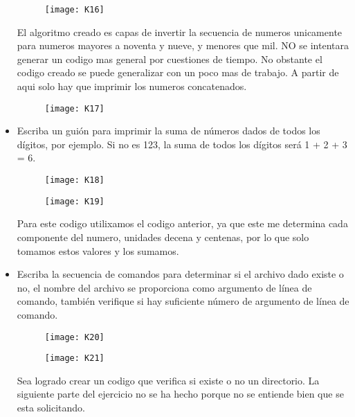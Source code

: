 \documentclass{article}
\begin{document}
\begin{itemize}
\begin{figure}[H]
\centerline{\texttt{[image: K16]}}
\caption{}
\label{fig}
\end{figure}

El algoritmo creado es capas de invertir la secuencia de numeros unicamente para numeros mayores a noventa y nueve, y menores que mil. NO se intentara generar un codigo mas general por cuestiones de tiempo. No obstante el codigo creado se puede generalizar con un poco mas de trabajo. A partir de aqui solo hay que imprimir los numeros concatenados.

\begin{figure}[H]
\centerline{\texttt{[image: K17]}}
\caption{}
\label{fig}
\end{figure}

    \item Escriba un guión para imprimir la suma de números dados de todos los dígitos, por ejemplo. Si no es 123, la suma de todos los dígitos será 1 + 2 + 3 = 6.

\begin{figure}[H]
\centerline{\texttt{[image: K18]}}
\caption{}
\label{fig}
\end{figure}

\begin{figure}[H]
\centerline{\texttt{[image: K19]}}
\caption{}
\label{fig}
\end{figure}

Para este codigo utilixamos el codigo anterior, ya que este me determina cada componente del numero, unidades decena y centenas, por lo que solo tomamos estos valores y los sumamos.

    \item Escriba la secuencia de comandos para determinar si el archivo dado existe o no, el nombre del archivo se proporciona como argumento de línea de comando, también verifique si hay suficiente número de argumento de línea de comando.

\begin{figure}[H]
\centerline{\texttt{[image: K20]}}
\caption{}
\label{fig}
\end{figure}

\begin{figure}[H]
\centerline{\texttt{[image: K21]}}
\caption{}
\label{fig}
\end{figure}

Sea logrado crear un codigo que verifica si existe o no un directorio. La siguiente parte del ejercicio no se ha hecho porque no se entiende bien que se esta solicitando.


\end{itemize}
\end{document}
